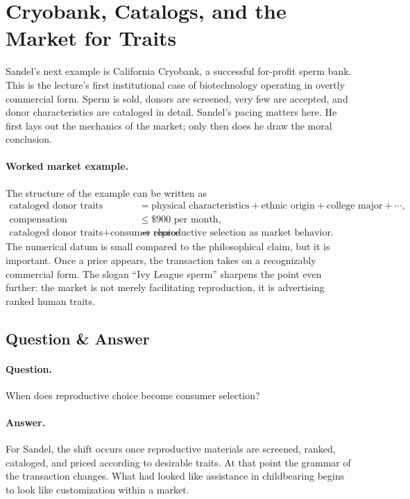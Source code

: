 \section{Cryobank, Catalogs, and the Market for Traits}

Sandel's next example is California Cryobank, a successful for-profit sperm bank. This is the lecture's first institutional case of biotechnology operating in overtly commercial form. Sperm is sold, donors are screened, very few are accepted, and donor characteristics are cataloged in detail. Sandel's pacing matters here. He first lays out the mechanics of the market; only then does he draw the moral conclusion.

\paragraph{Worked market example.} The structure of the example can be written as
\begin{align}
\text{cataloged donor traits}
&=
\text{physical characteristics}
+
\text{ethnic origin}
+
\text{college major}
+\cdots,\\
\text{compensation}
&\leq
\$900 \text{ per month},\\
\text{cataloged donor traits}
+
\text{consumer choice}
&\Longrightarrow
\text{reproductive selection as market behavior}.
\end{align}
The numerical datum is small compared to the philosophical claim, but it is important. Once a price appears, the transaction takes on a recognizably commercial form. The slogan ``Ivy League sperm'' sharpens the point even further: the market is not merely facilitating reproduction, it is advertising ranked human traits.

\subsection{Question \& Answer}

\paragraph{Question.} When does reproductive choice become consumer selection?

\paragraph{Answer.} For Sandel, the shift occurs once reproductive materials are screened, ranked, cataloged, and priced according to desirable traits. At that point the grammar of the transaction changes. What had looked like assistance in childbearing begins to look like customization within a market.

